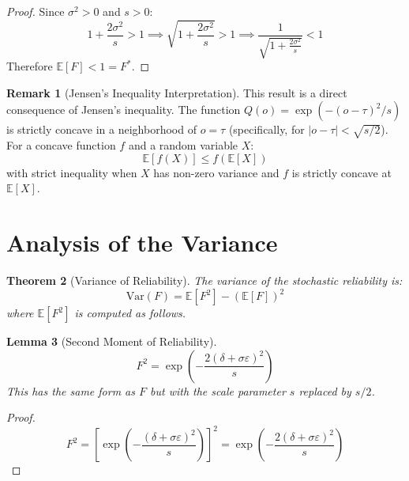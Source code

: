 \documentclass[11pt,a4paper]{article}
\newtheorem{theorem}{Theorem}
\newtheorem{lemma}[theorem]{Lemma}
\theoremstyle{definition}
\newtheorem{remark}[theorem]{Remark}
\newcommand{\E}{\mathbb{E}}
\newcommand{\Var}{\mathrm{Var}}
\begin{document}
\begin{proof}
Since $\sigma^2 > 0$ and $s > 0$:
\begin{equation}
    1 + \frac{2\sigma^2}{s} > 1 \implies \sqrt{1 + \frac{2\sigma^2}{s}} > 1 \implies \frac{1}{\sqrt{1 + \frac{2\sigma^2}{s}}} < 1
\end{equation}
Therefore $\E[F] < 1 = F^*$.
\end{proof}

\begin{remark}[Jensen's Inequality Interpretation]
This result is a direct consequence of Jensen's inequality. The function $Q(o) = \exp(-(o-\tau)^2/s)$ is strictly concave in a neighborhood of $o = \tau$ (specifically, for $|o - \tau| < \sqrt{s/2}$). For a concave function $f$ and a random variable $X$:
\begin{equation}
    \E[f(X)] \leq f(\E[X])
\end{equation}
with strict inequality when $X$ has non-zero variance and $f$ is strictly concave at $\E[X]$.
\end{remark}

\section{Analysis of the Variance}

\begin{theorem}[Variance of Reliability]
\label{thm:variance-F}
The variance of the stochastic reliability is:
\begin{equation}
    \Var(F) = \E[F^2] - (\E[F])^2
\end{equation}
where $\E[F^2]$ is computed as follows.
\end{theorem}

\begin{lemma}[Second Moment of Reliability]
\begin{equation}
    F^2 = \exp\left(-\frac{2(\delta + \sigma\varepsilon)^2}{s}\right)
\end{equation}
This has the same form as $F$ but with the scale parameter $s$ replaced by $s/2$.
\end{lemma}

\begin{proof}
\begin{equation}
    F^2 = \left[\exp\left(-\frac{(\delta + \sigma\varepsilon)^2}{s}\right)\right]^2 = \exp\left(-\frac{2(\delta + \sigma\varepsilon)^2}{s}\right)
\end{equation}
\end{proof}
\end{document}
